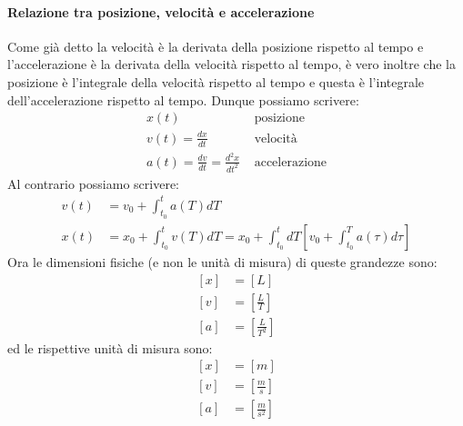     \paragraph{Relazione tra posizione, velocità e accelerazione}
        Come già detto la velocità è la derivata della posizione rispetto al tempo e l'accelerazione è la derivata della velocità rispetto al tempo, è vero inoltre che la posizione è l'integrale della velocità rispetto al tempo e questa è l'integrale dell'accelerazione rispetto al tempo. Dunque possiamo scrivere:
        \begin{align}
            x(t) &\text{ posizione} \\
            v(t) = \frac{dx}{dt} &\text{ velocità} \\
            a(t) = \frac{dv}{dt} = \frac{d^2x}{dt^2} &\text{ accelerazione}
        \end{align} 
        Al contrario possiamo scrivere:
        \begin{align}
            v(t) &= v_0 + \int_{t_0}^{t} a(T) dT\\
            x(t) &= x_0 + \int_{t_0}^{t} v(T) dT = x_0 + \int_{t_0}^{t} dT \left[v_0+\int_{t_0}^{T} a(\tau) d\tau\right]
        \end{align}
        Ora le dimensioni fisiche (e non le unità di misura) di queste grandezze sono:
        $$
            \begin{aligned}
                \left[x\right] &= \left[L\right]\\
                [v] &= \left[\frac{L}{T}\right]\\
                [a] &= \left[\frac{L}{T^2}\right]
            \end{aligned}
        $$
        ed le rispettive unità di misura sono:
        $$
            \begin{aligned}
                \left[x\right] &= \left[m\right]\\
                [v] &= \left[\frac{m}{s}\right]\\
                [a] &= \left[\frac{m}{s^2}\right]
            \end{aligned}
        $$
